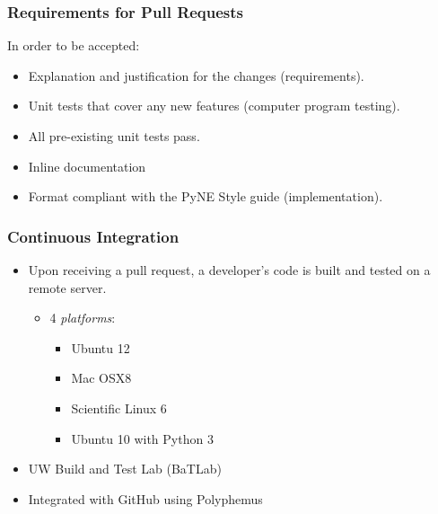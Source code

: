 \documentclass[12pt]{beamer}
\begin{document}
\begin{frame}
\frametitle{Requirements for Pull Requests}

In order to be accepted:

\begin{itemize}
\item{Explanation and justification for the changes (\alert{requirements}).}
\item{Unit tests that cover any new features (\alert{computer program testing}).}
\item{All pre-existing unit tests pass.}
\item{Inline documentation}
\item{Format compliant with the PyNE Style guide (\alert{implementation}).}
\end{itemize}

\end{frame}

\begin{frame}
\frametitle{Continuous Integration \cite{beck1998extreme}}

\begin{itemize}
\item{Upon receiving a pull request, a developer's code is built and tested on a remote server.}
    \begin{itemize}
    \item{4 \emph{platforms}:}
        \begin{itemize}
        \item{Ubuntu 12}
        \item{Mac OSX8}
        \item{Scientific Linux 6}
        \item{Ubuntu 10 with Python 3}
        \end{itemize}
    \end{itemize}
\item{UW Build and Test Lab (BaTLab) \cite{batlab_2014}}
\item{Integrated with GitHub using Polyphemus \cite{polyphemus_2014}}
\end{itemize}
\end{frame}
\end{document}
